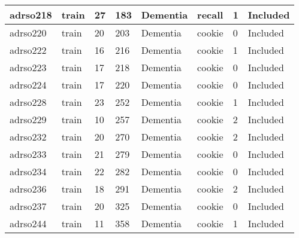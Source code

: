 \begin{center}
\begin{longtable}{|l|l|l|l|l|l|l|l|}
adrso218       & train                 & 27              & 183                & Dementia             & recall          & 1                & Included      \\ \hline
adrso220       & train                 & 20              & 203                & Dementia             & cookie          & 0                & Included      \\ \hline
adrso222       & train                 & 16              & 216                & Dementia             & cookie          & 1                & Included      \\ \hline
adrso223       & train                 & 17              & 218                & Dementia             & cookie          & 0                & Included      \\ \hline
adrso224       & train                 & 17              & 220                & Dementia             & cookie          & 0                & Included      \\ \hline
adrso228       & train                 & 23              & 252                & Dementia             & cookie          & 1                & Included      \\ \hline
adrso229       & train                 & 10              & 257                & Dementia             & cookie          & 2                & Included      \\ \hline
adrso232       & train                 & 20              & 270                & Dementia             & cookie          & 2                & Included      \\ \hline
adrso233       & train                 & 21              & 279                & Dementia             & cookie          & 0                & Included      \\ \hline
adrso234       & train                 & 22              & 282                & Dementia             & cookie          & 0                & Included      \\ \hline
adrso236       & train                 & 18              & 291                & Dementia             & cookie          & 2                & Included      \\ \hline
adrso237       & train                 & 20              & 325                & Dementia             & cookie          & 0                & Included      \\ \hline
adrso244       & train                 & 11              & 358                & Dementia             & cookie          & 1                & Included      \\ \hline

\end{longtable}
\end{center}
